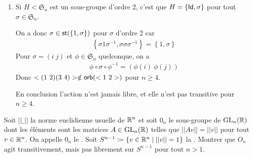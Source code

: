 \documentclass[french,a4paper,10pt]{article}
\begin{document}
\begin{td-sol}
\begin{enumerate}[label=$(\roman*)$]
\begin{myrappel}
					\[\begin{aligned}
						\scr D_n&\to\mathfrak{S}_{\mu_n}\\
						R^j&\mapsto\left[\zeta^k\mapsto e^{\frac{2j\pi i}n}\zeta^k\right]\\
						R^jS&\mapsto\left[\zeta^k\mapsto e^{\frac{2j\pi i}n}\zeta^{-k}\right]
					\end{aligned}\]
				\end{myrappel}
			
			L'action de $\scr D_n$ sur $\mu_n$ n'est pas libre car $S\in\st(1)$ et donc $S\cdot 1=\ol 1=1$.
			
			L'action est transitive car $\zeta^k=R^k\cdot 1\quad\forall \zeta^k\in\mu_n$.
			
			\item Si $H<\mathfrak{S}_n$ est un sous-groupe d'ordre 2, c'est que $H=\{\operatorname{\mathsf{Id}}, \sigma\}$ pour tout $\sigma\in \mathfrak{S}_n$.
			
			On a donc $\sigma\in\operatorname{\mathsf{st}}(\{1, \sigma\})$ pour $\sigma$ d'ordre 2 car
				\[\begin{aligned}
					\left\{\sigma 1\sigma^{-1},\sigma\sigma\sigma^{-1}\right\}=\left\{1, \sigma\right\}
				\end{aligned}\]
			Pour $\sigma = (i~j)$ et $\phi\in\mathfrak{S}_n$ quelconque, on a
				\[\begin{aligned}
					\phi\circ\sigma\circ\phi^{-1}=\left(\phi(i)~\phi(j)\right)
				\end{aligned}\]
			Donc $<(1~2)(3~4)>\notin\operatorname{\mathsf{orb}}(<1~2>)$ pour $n\ge 4$.
			
			En conclusion l'action n'est jamais libre, et elle n'est pas transitive pour $n\ge 4$.
		\end{enumerate}
	\end{td-sol}
	\medspace
	\begin{td-exo}
	Soit $||\_||$ la norme euclidienne usuelle de $\mathbb{R}^n$ et soit $0_n$ le sous-groupe de $\text{GL}_{n}(\mathbb{R})$ dont les éléments sont les matrices $A\in\text{GL}_{n}(\mathbb{R})$ telles que $||Av||=||v||$ pour tout $v\in\mathbb{R}^n$. On appelle $0_n$ le . Soit $S^{n-1}\coloneq \{v\in \mathbb{R}^n\mid||v||=1\}$ la . Montrer que $O_n$ agit transitivement, mais pas librement sur $S^{n-1}$ pour tout $n>1$.
	\end{td-exo}
	
	
\end{document}
